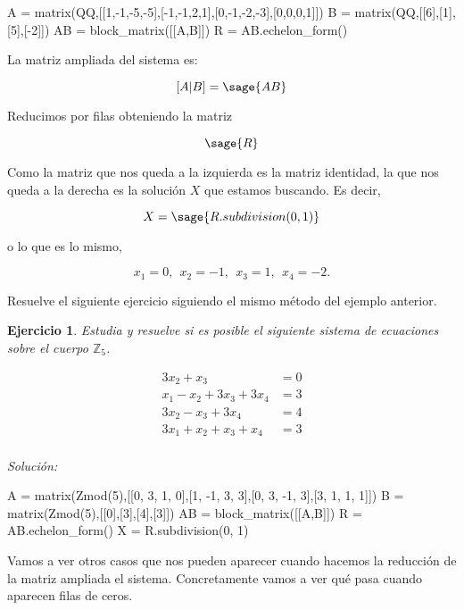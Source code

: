 \documentclass{amsart}
\newtheorem{ejer}{Ejercicio}
\begin{document}
\begin{sageblock}
A = matrix(QQ,[[1,-1,-5,-5],[-1,-1,2,1],[0,-1,-2,-3],[0,0,0,1]])
B = matrix(QQ,[[6],[1],[5],[-2]])
AB = block_matrix([[A,B]])
R = AB.echelon_form()
\end{sageblock}

La matriz ampliada del sistema es:

\[[A|B] = \sage{AB} \]

Reducimos por filas obteniendo la matriz

\[ \sage{R} \]

Como la matriz que nos queda a la izquierda es la matriz identidad, la que nos
queda a la derecha es la solución $X$ que estamos buscando. Es decir, 

$$ X = \sage{R.subdivision(0,1)} $$

o lo que es lo mismo, 

\[ x_1 = 0, \ \ x_2 = -1,  \ \ x_3 = 1,  \ \ x_4 = -2.\]


Resuelve el siguiente ejercicio siguiendo el mismo método del ejemplo anterior.

\begin{ejer}
Estudia y resuelve si es posible el siguiente sistema de ecuaciones sobre el 
cuerpo ${\mathbb Z}_5$.

\begin{align*}
3 x_{2} + x_{3} &= 0\\
x_{1} - x_{2} + 3 x_{3} + 3 x_{4} &= 3\\
3 x_{2} - x_{3} + 3 x_{4} &= 4 \\
3 x_{1} + x_{2} + x_{3} + x_{4} &= 3\\
\end{align*}
\end{ejer}
{\it Solución:}

\begin{sageblock}
A = matrix(Zmod(5),[[0, 3, 1, 0],[1, -1, 3, 3],[0, 3, -1, 3],[3, 1, 1, 1]])
B = matrix(Zmod(5),[[0],[3],[4],[3]])
AB = block_matrix([[A,B]])
R = AB.echelon_form()
X = R.subdivision(0, 1)
\end{sageblock}

\vspace{1cm}

Vamos a ver otros casos que nos pueden aparecer cuando hacemos la reducción
de la matriz ampliada el sistema. Concretamente vamos a ver qué pasa cuando 
aparecen filas de ceros.  
\end{document}
